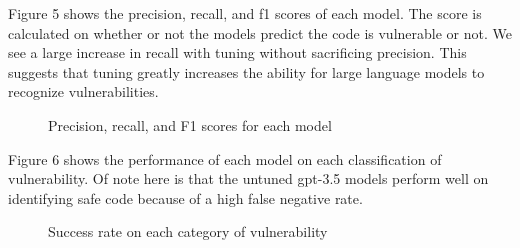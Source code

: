 \documentclass[acmsmall]{acmart}
\begin{document}
Figure 5 shows the precision, recall, and f1 scores of each model. The score is calculated on whether or not the models predict the code is vulnerable or not. We see a large increase in recall with tuning without sacrificing precision. This suggests that tuning greatly increases the ability for large language models to recognize vulnerabilities.\\


\begin{figure}[htp] 
\caption{Precision, recall, and F1 scores for each model}
\end{figure}

Figure 6 shows the performance of each model on each classification of vulnerability. Of note here is that the untuned gpt-3.5 models perform well on identifying safe code because of a high false negative rate.

\begin{figure}[htp] 
\caption{Success rate on each category of vulnerability}
\end{figure}
\end{document}
